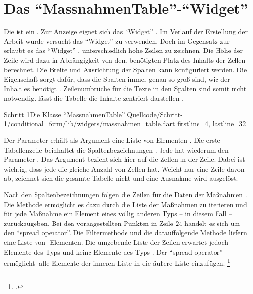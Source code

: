 
\ifodd\value{page}\hbox{}\newpage\fi
\section{Das \enquote{MassnahmenTable}-\enquote{Widget}}

Die  ist ein   .
Zur Anzeige eignet sich das \enquote{Widget}  . Im Verlauf der Erstellung der Arbeit wurde versucht das \enquote{Widget}  zu verwenden.
Doch im Gegensatz zur  erlaubt es das \enquote{Widget} , unterschiedlich hohe Zeilen zu zeichnen.
Die Höhe der Zeile wird dazu in Abhängigkeit von dem benötigten Platz des Inhalts der Zellen berechnet.
Die Breite und Ausrichtung der Spalten kann konfiguriert werden.
Die Eigenschaft  sorgt dafür,
dass die Spalten immer genau so groß sind,
wie der Inhalt es benötigt . 
Zeilenumbrüche für die Texte in den Spalten sind somit nicht notwendig.
 lässt die  Tabelle die Inhalte zentriert darstellen .


\begin{alexlisting}{Schritt 1}{Die Klasse \enquote{MassnahmenTable}}
    {Quellcode/Schritt-1/conditional_form/lib/widgets/massnahmen_table.dart}
    {firstline=4, lastline=32}
    \label{lst:Schritt1KlasseMassnahmenTable}
  \end{alexlisting}

Der Parameter  erhält als Argument eine Liste von  Elementen .
Die erste Tabellenzeile beinhaltet die Spaltenbezeichnungen .
Jede  hat wiederum den Parameter .
Das Argument bezieht sich hier auf die Zellen in der Zeile.
Dabei ist wichtig, dass jede  die gleiche Anzahl von Zellen hat.
Weicht nur eine Zeile davon ab, zeichnet sich die gesamte Tabelle nicht und eine Ausnahme wird ausgelöst.

\clearpage
Nach den Spaltenbezeichnungen folgen die Zeilen für die Daten der Maßnahmen .
Die Methode   ermöglicht es dazu durch die Liste der Maßnahmen zu iterieren und für jede Maßnahme ein Element eines völlig anderen Typs -- in diesem Fall  -- zurückzugeben.
Bei den vorangestellten Punkten  in Zeile 24 handelt es sich um den \enquote{spread operator}.
Die Filtermethode  und die darauffolgende Methode  liefern eine Liste von -Elementen.
Die umgebende Liste der Zeilen   erwartet jedoch Elemente des Typs  und keine Elemente des Typs .
Der \enquote{spread operator} ermöglicht,
alle Elemente der inneren Liste in die äußere Liste einzufügen. \footcite[Vgl.][]{SpreadOperator}




